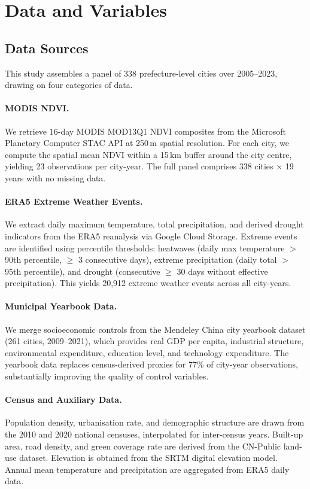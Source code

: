 \section{Data and Variables}
\label{sec:data}

\subsection{Data Sources}

This study assembles a panel of 338 prefecture-level cities over
2005--2023, drawing on four categories of data.

\paragraph{MODIS NDVI.}
We retrieve 16-day MODIS MOD13Q1 NDVI composites from the Microsoft
Planetary Computer STAC API at 250\,m spatial resolution. For each
city, we compute the spatial mean NDVI within a 15\,km buffer around
the city centre, yielding 23 observations per city-year. The full panel
comprises 338 cities $\times$ 19 years with no missing data.

\paragraph{ERA5 Extreme Weather Events.}
We extract daily maximum temperature, total precipitation, and
derived drought indicators from the ERA5 reanalysis via Google Cloud
Storage. Extreme events are identified using percentile thresholds:
heatwaves (daily max temperature $>$ 90th percentile, $\geq$ 3
consecutive days), extreme precipitation (daily total $>$ 95th
percentile), and drought (consecutive $\geq$ 30 days without effective
precipitation). This yields 20,912 extreme weather events across all
city-years.

\paragraph{Municipal Yearbook Data.}
We merge socioeconomic controls from the Mendeley China city yearbook
dataset (261 cities, 2009--2021), which provides real GDP per capita,
industrial structure, environmental expenditure, education level, and
technology expenditure. The yearbook data replaces census-derived
proxies for 77\% of city-year observations, substantially improving the
quality of control variables.

\paragraph{Census and Auxiliary Data.}
Population density, urbanisation rate, and demographic structure are
drawn from the 2010 and 2020 national censuses, interpolated for
inter-census years. Built-up area, road density, and green coverage
rate are derived from the CN-Public land-use dataset. Elevation is
obtained from the SRTM digital elevation model. Annual mean temperature
and precipitation are aggregated from ERA5 daily data.

